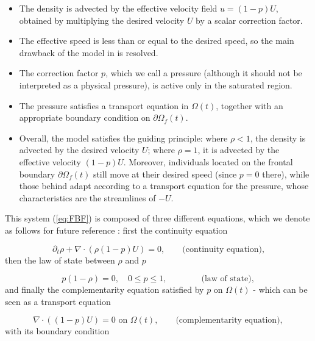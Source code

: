 \documentclass[11pt,twoside]{article}
\numberwithin{equation}{section}
\begin{document}
\begin{itemize}[label=$\bullet$]

\item The density is advected by the effective velocity field $u = (1-p)U$, obtained by multiplying the desired velocity $U$ by a scalar correction factor.
\item The effective speed is less than or equal to the desired speed, so the main drawback of the model in \cite{maury_macroscopic_2010} is resolved.
\item The correction factor $p$, which we call a pressure (although it should not be interpreted as a physical pressure), is active only in the saturated region.
\item The pressure satisfies a transport equation in $\Omega(t)$, together with an appropriate boundary condition on $\partial \Omega_f(t)$.
\item Overall, the model satisfies the guiding principle: where $\rho < 1$, the density is advected by the desired velocity $U$; where $\rho = 1$, it is advected by the effective velocity $(1-p)U$. Moreover, individuals located on the frontal boundary $\partial \Omega_f(t)$ still move at their desired speed (since $p=0$ there), while those behind adapt according to a transport equation for the pressure, whose characteristics are the streamlines of $-U$.

\end{itemize}

This system (\ref{eq:FBF}) is composed of three different equations, which we denote as follows for future reference : first the continuity equation 

\begin{equation}
\label{eq:continuity}
\partial_t \rho + \nabla \cdot (\rho(1-p)U) = 0, \qquad \text{(continuity equation),}
\end{equation}
then the law of state between $\rho$ and $p$

\begin{equation}
\label{eq:state}
 p(1-\rho) = 0, \quad 0 \le p \le 1,  \qquad \qquad \text{(law of state)},
\end{equation}
and finally the complementarity equation satisfied by $p$ on $\Omega(t)$ - which can be seen  as a transport equation 

\begin{equation}
\label{eq:complementarity}
\nabla \cdot ((1-p)U) = 0 \text{ on } \Omega(t), \qquad \text{(complementarity equation)},
\end{equation}
with its boundary condition 
\end{document}
